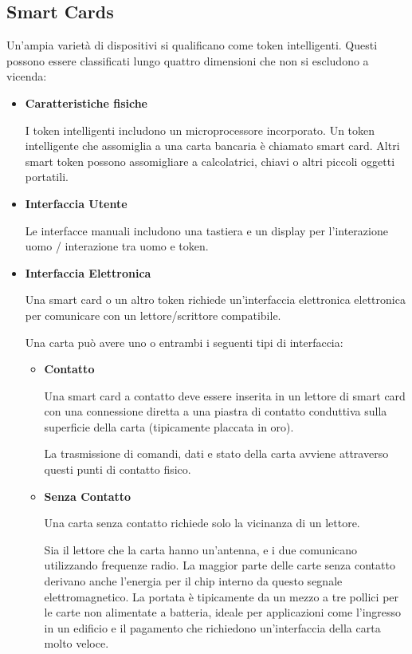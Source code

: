 \subsection{Smart Cards}
Un'ampia varietà di dispositivi si qualificano come token intelligenti. Questi possono essere classificati lungo quattro dimensioni che non si escludono a vicenda:
\begin{itemize}
    \item \textbf{Caratteristiche fisiche} 
    
    I token intelligenti includono un microprocessore incorporato. Un token intelligente che assomiglia a una carta bancaria è chiamato smart card. Altri smart token possono assomigliare a calcolatrici, chiavi o altri piccoli oggetti portatili.
    
    \item \textbf{Interfaccia Utente}
    
    Le interfacce manuali includono una tastiera e un display per l'interazione uomo / interazione tra uomo e token.
     
    \item \textbf{Interfaccia Elettronica}
    
    Una smart card o un altro token richiede un'interfaccia elettronica elettronica per comunicare con un lettore/scrittore compatibile.
    
    \singlespacing
    
    Una carta può avere uno o entrambi i seguenti tipi di interfaccia:
    
    \begin{itemize}
        \item \textbf{Contatto}
        
        Una smart card a contatto deve essere inserita in un lettore di smart card con una connessione diretta a una piastra di contatto conduttiva sulla superficie della carta (tipicamente placcata in oro).
        
        La trasmissione di comandi, dati e stato della carta avviene attraverso questi punti di contatto fisico.

        \item \textbf{Senza Contatto}
        
        Una carta senza contatto richiede solo la vicinanza di un lettore.
        
        Sia il lettore che la carta hanno un'antenna, e i due comunicano utilizzando frequenze radio. La maggior parte delle carte senza contatto derivano anche l'energia per il chip interno da questo segnale elettromagnetico. La portata è tipicamente da un mezzo a tre pollici per le carte non alimentate a batteria, ideale per applicazioni come l'ingresso in un edificio e il pagamento che richiedono un'interfaccia della carta molto veloce.
        

\end{itemize}
\end{itemize}

